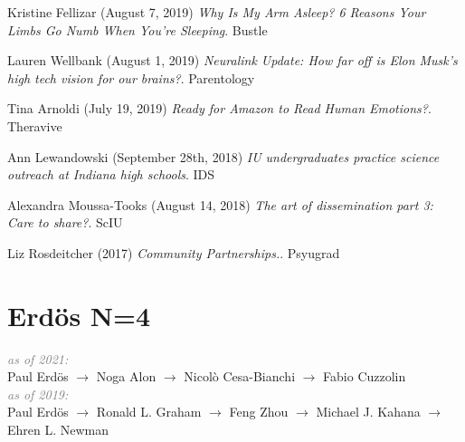 \documentclass[10pt]{cooperCV2}
\begin{document}
\begin{etaremune}[itemindent=-1.5\bibhang, topsep=0pt,
				   itemsep=\bibsep,partopsep=0pt,parsep=0pt,leftmargin={\bibhang+\widthof{[999]}}]
	
    \item Kristine Fellizar (August 7, 2019) \textit{Why Is My Arm Asleep? 6 Reasons Your Limbs Go Numb When You're Sleeping}. Bustle
     
	
    \item Lauren Wellbank (August 1, 2019) \textit{Neuralink Update: How far off is Elon Musk’s high tech vision for our brains?}. Parentology
     
	
    \item Tina Arnoldi (July 19, 2019) \textit{Ready for Amazon to Read Human Emotions?}. Theravive
     
	
    \item Ann Lewandowski (September 28th, 2018) \textit{IU undergraduates practice science outreach at Indiana high schools}. IDS
     
	
    \item Alexandra Moussa-Tooks (August 14, 2018) \textit{The art of dissemination part 3: Care to share?}. ScIU
     
	
    \item Liz Rosdeitcher (2017) \textit{Community Partnerships.}. Psyugrad
     
	


\end{etaremune}




























\section{Erdös N=4}

\textit{\textcolor{grey}{as of 2021:}}\\
Paul Erdös $\rightarrow$ Noga Alon $\rightarrow$ Nicolò Cesa-Bianchi $\rightarrow$ Fabio Cuzzolin\\

\textit{\textcolor{grey}{as of 2019:}}\\
Paul Erdös $\rightarrow$ Ronald L. Graham $\rightarrow$ Feng Zhou $\rightarrow$ Michael J. Kahana $\rightarrow$ Ehren L. Newman\\
\end{document}
